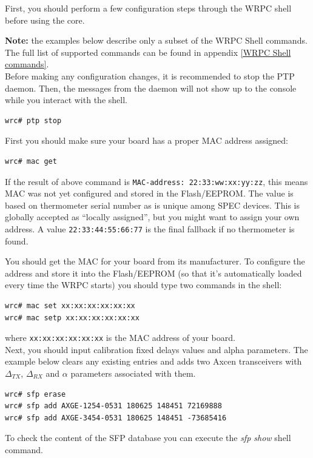 \documentclass[a4paper, 12pt]{article}
\begin{document}
First, you should perform a few configuration steps through the WRPC shell
before using the core.

\noindent\textbf{Note:} the examples below describe only a subset of the WRPC
Shell commands. The full list of supported commands can be found in appendix
\ref{WRPC Shell commands}.\\

Before making any configuration changes, it is recommended to stop the
PTP daemon.  Then, the messages from the daemon will not show up to the
console while you interact with the shell.

\begin{lstlisting}
wrc# ptp stop
\end{lstlisting}

\noindent First you should make sure your board has a proper MAC address
assigned:
\begin{lstlisting}
wrc# mac get
\end{lstlisting}
If the result of above command is \texttt{MAC-address: 22:33:ww:xx:yy:zz}, this
means MAC was not yet configured and stored in the Flash/EEPROM. The value is
based on thermometer serial number as is unique among SPEC devices. This is
globally accepted as ``locally assigned'', but you might want to assign your own
address. A value \texttt{22:33:44:55:66:77} is the final fallback if no
thermometer is found.

You should get the MAC for your board from its manufacturer. To configure the
address and store it into the Flash/EEPROM (so that it's automatically loaded
every time the WRPC starts) you should type two commands in the shell:
\begin{lstlisting}
wrc# mac set xx:xx:xx:xx:xx:xx
wrc# mac setp xx:xx:xx:xx:xx:xx
\end{lstlisting}
where \texttt{xx:xx:xx:xx:xx:xx} is the MAC address of your board.\\

Next, you should input calibration fixed delays values and alpha parameters. The
example below clears any existing entries and adds two Axcen transceivers with
$\Delta_{TX}$, $\Delta_{RX}$ and $\alpha$ parameters associated with them.

\begin{lstlisting}
wrc# sfp erase
wrc# sfp add AXGE-1254-0531 180625 148451 72169888
wrc# sfp add AXGE-3454-0531 180625 148451 -73685416
\end{lstlisting}

To check the content of the SFP database you can execute the \textit{sfp show}
shell command.\\
\end{document}

